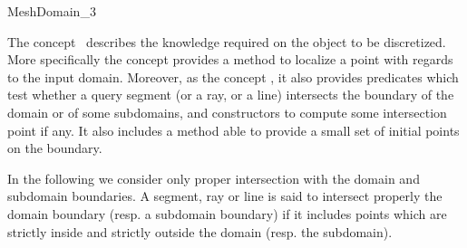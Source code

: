 \ccRefPageBegin


\begin{ccRefConcept}{MeshDomain_3}


\ccDefinition
  
The concept \ccRefName\ describes the knowledge required on the
object to be discretized. 
More specifically the concept provides 
a method to localize a point with regards to the  input domain.
Moreover, as the concept , 
it also provides  
 predicates which test whether a query segment
(or a ray,  or a line) intersects the boundary of the domain or 
of some subdomains, and constructors 
 to compute some intersection point if any. 
It also includes a method able to provide
a small set of initial points on the boundary. 

In the following we consider only proper intersection with the domain and
subdomain boundaries. 
A segment, ray or line is said to intersect properly the domain boundary
(resp. a subdomain boundary)
if it includes points which are strictly inside
and strictly outside  the domain (resp. the subdomain).






\ccTypes


\ccGlue
{}
\ccGlue
{}
\ccGlue
{}


\end{ccRefConcept}
